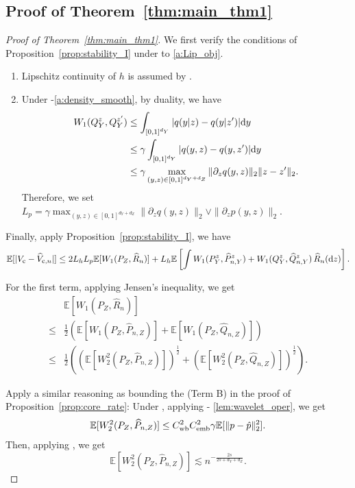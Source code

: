 \documentclass{article}
\theoremstyle{plain}
\theoremstyle{definition}
\def\EE{\mathbb{E}}
\def\PP{P}
\def\QQ{Q}
\newcommand{\cc}{\textup{c}}
\theoremstyle{plain}
\newcommand{\diff}{{\rm d}}
\def\EE{\mathbb{E}}
\begin{document}
\subsection{Proof of Theorem~\ref{thm:main_thm1}}
\begin{proof}[Proof of Theorem~\ref{thm:main_thm1}]
    We first verify the conditions of Proposition~\ref{prop:stability_I} under  to \ref{a:Lip_obj}.
    \begin{enumerate}[label=(\roman*)]
        \item Lipschitz continuity of $h$ is assumed by .
        \item Under -\ref{a:density_smooth}, by duality, we have
        \begin{align*}
            W_1(Q_Y^z, Q_Y^{z'}) &\leq \int_{[0,1]^{d_Y}} |q(y | z) - q(y | z')| \diff y \\
            &\leq \gamma \int_{[0,1]^{d_Y}} |q(y, z) - q(y, z')| \diff y \\
            &\leq \gamma \max_{(y,z) \in [0,1]^{d_Y + d_Z}}\|\partial_z q(y,z)\|_2 \|z - z'\|_2. 
        \end{align*}
        Therefore, we set $L_p = \gamma \max_{(y,z) \in [0,1]^{d_Y + d_Z}}\|\partial_z q(y,z)\|_2 \vee \|\partial_z p(y,z)\|_2$.
            
    \end{enumerate}

    Finally, apply Proposition~\ref{prop:stability_I}, we have
    \[
        \EE[|V_{\cc} - \widehat V_{\cc, n}|] \leq 2L_h L_p \EE[W_1(\PP_Z, \widehat R_{n})] + L_h \EE\left[\int W_1(\PP_Y^z, \widehat \PP_{n,Y}^z) + W_1(\QQ_Y^z, \widehat \QQ_{n,Y}^z) \, \widehat R_{n}(\diff z)\right]. 
    \]

    For the first term, applying Jensen's inequality, we get
    \begin{align*}
        &\EE[W_1(\PP_Z, \widehat R_{n})]\\
        \leq & \frac{1}{2}(\EE[W_1(\PP_Z, \widehat P_{n, Z})] + \EE[W_1(\PP_Z, \widehat Q_{n, Z})])\\
        \leq & \frac{1}{2} \left((\EE[W_2^2(\PP_Z, \widehat P_{n, Z})])^{\frac{1}{2}} + (\EE[W_2^2(\PP_Z, \widehat Q_{n, Z})])^{\frac{1}{2}}\right).
    \end{align*}
        
    Apply a similar reasoning as bounding the (Term B) in the proof of Proposition~\ref{prop:core_rate}: 
    Under , applying  - \ref{lem:wavelet_oper}, we get
    \begin{align*}
        \EE[W_2^2(\PP_Z, \widehat P_{n, Z})] 
        \leq C_{\textup{wb}}^2 C_{\textup{emb}}^2 \gamma \EE[\|p - \hat p\|_2^2]. 
    \end{align*}
    Then, applying , we get
    \[
        \EE[W_2^2(\PP_Z, \widehat P_{n, Z})] \lesssim n^{-\frac{2s}{2s+ d_Y + d_Z}}.
    \]
    


\end{proof}
\end{document}
